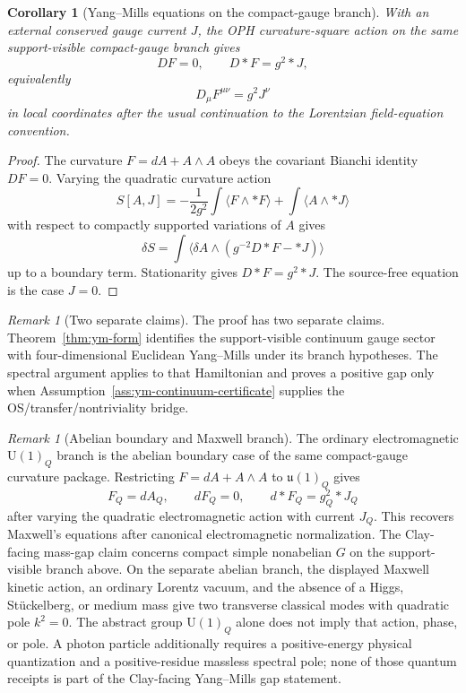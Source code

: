 \documentclass[11pt]{article}
\numberwithin{equation}{section}
\newtheorem{corollary}[theorem]{Corollary}
\theoremstyle{remark}
\newtheorem{remark}[theorem]{Remark}
\begin{document}
\begin{corollary}[Yang--Mills equations on the compact-gauge branch]
\label{cor:ym-equations}
With an external conserved gauge current \(J\), the OPH curvature-square action on the same
support-visible compact-gauge branch gives
\[
DF=0,
\qquad
D{*}F=g^2{*}J,
\]
equivalently
\[
D_\mu F^{\mu\nu}=g^2J^\nu
\]
in local coordinates after the usual continuation to the Lorentzian field-equation convention.
\end{corollary}

\begin{proof}
The curvature \(F=dA+A\wedge A\) obeys the covariant Bianchi identity \(DF=0\). Varying the
quadratic curvature action
\[
S[A,J]
=
-\frac{1}{2g^2}\int \langle F\wedge *F\rangle
+\int \langle A\wedge *J\rangle
\]
with respect to compactly supported variations of \(A\) gives
\[
\delta S
=
\int \langle \delta A\wedge (g^{-2}D{*}F-{*}J)\rangle
\]
up to a boundary term. Stationarity gives \(D{*}F=g^2{*}J\). The source-free equation is the
case \(J=0\).
\end{proof}

\begin{remark}[Two separate claims]
The proof has two separate claims. Theorem~\ref{thm:ym-form} identifies the support-visible
continuum gauge sector with four-dimensional Euclidean Yang--Mills under its branch hypotheses.
The spectral argument applies to that Hamiltonian and proves a positive gap only when
Assumption~\ref{ass:ym-continuum-certificate} supplies the OS/transfer/nontriviality bridge.
\end{remark}

\begin{remark}[Abelian boundary and Maxwell branch]
The ordinary electromagnetic \(\mathrm U(1)_Q\) branch is the abelian boundary case of the same
compact-gauge curvature package. Restricting \(F=dA+A\wedge A\) to \(\mathfrak u(1)_Q\) gives
\[
F_Q=dA_Q,
\qquad
dF_Q=0,
\qquad
d{*}F_Q=g_Q^2{*}J_Q
\]
after varying the quadratic electromagnetic action with current \(J_Q\). This recovers Maxwell's
equations after canonical electromagnetic normalization. The Clay-facing mass-gap claim concerns
compact simple nonabelian \(G\) on the support-visible branch above. On the separate abelian branch,
the displayed Maxwell kinetic action, an ordinary Lorentz vacuum, and the absence of a Higgs,
St\"uckelberg, or medium mass give two transverse classical modes with quadratic pole
\(k^2=0\). The abstract group \(\mathrm U(1)_Q\) alone does not imply that action, phase, or pole.
A photon particle additionally requires a positive-energy physical quantization and a
positive-residue massless spectral pole; none of those quantum receipts is part of the Clay-facing
Yang--Mills gap statement.
\end{remark}
\end{document}
